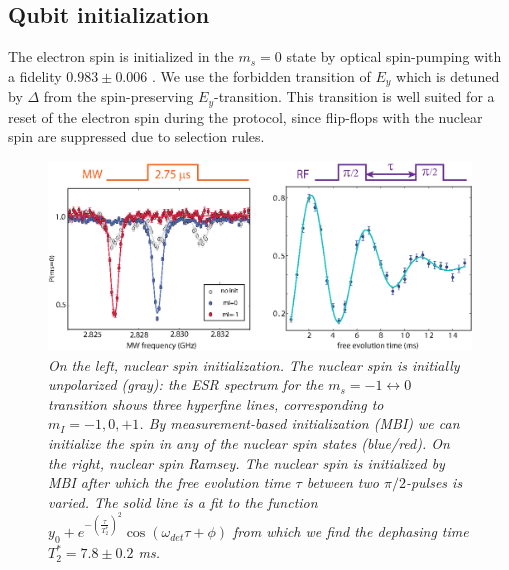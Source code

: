 \subsection{Qubit initialization}
The electron spin is initialized in the $m_s=0$ state by optical spin-pumping with a fidelity $0.983 \pm 0.006$ \cite{Robledo_Nature_2011}. We use the forbidden transition of $E_{y}$ which is detuned by $\Delta$ from the spin-preserving $E_{y}$-transition. This transition is well suited for a reset of the electron spin during the protocol, since flip-flops with the nuclear spin are suppressed due to selection rules. \\

\begin{figure} [h]
\centering
\includegraphics [width = 12 cm]{SOM/fig02_nuclearSpin_v2.eps}
\caption{\textit{On the left, nuclear spin initialization. The nuclear spin is initially unpolarized (gray): the ESR spectrum for the $m_s=-1 \leftrightarrow 0$ transition shows three hyperfine lines, corresponding to $m_I=-1,0,+1$. By measurement-based initialization (MBI) \cite{Pfaff_NatPhys_2012} we can initialize the spin in any of the nuclear spin states (blue/red). On the right, nuclear spin Ramsey. The nuclear spin is initialized by MBI after which the free evolution time $\tau$ between two $\pi/2$-pulses is varied. The solid line is a fit to the function $y_0 + e^{-(\frac{\tau}{T_{2}^{*}})^2}\cos{(\omega_{det} \tau + \phi )}$ from which we find the dephasing time $T_2^* = 7.8 \pm 0.2$ ms.}}
\label{fig:nuclearSpin}
\end{figure} 

